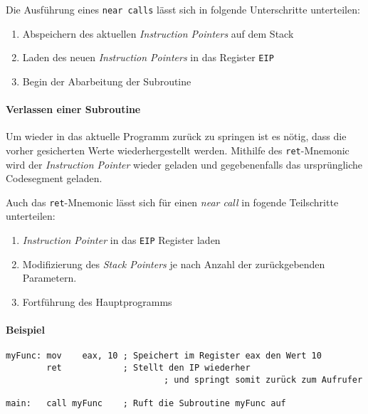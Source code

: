 Die Ausführung eines \texttt{near calls} lässt sich in folgende Unterschritte unterteilen:

\begin{enumerate}
	\item Abspeichern des aktuellen \textit{Instruction Pointers} auf dem Stack
	\item Laden des neuen \textit{Instruction Pointers} in das Register \texttt{EIP}
	\item Begin der Abarbeitung der Subroutine	
\end{enumerate}

\paragraph{Verlassen einer Subroutine}

Um wieder in das aktuelle Programm zurück zu springen ist es nötig, dass die vorher gesicherten Werte wiederhergestellt werden.
Mithilfe des \texttt{ret}-Mnemonic wird der \textit{Instruction Pointer} wieder geladen und gegebenenfalls das ursprüngliche Codesegment geladen.

Auch das \texttt{ret}-Mnemonic lässt sich für einen \textit{near call} in fogende Teilschritte unterteilen:
\begin{enumerate}
	\item \textit{Instruction Pointer} in das \texttt{EIP} Register laden
	\item Modifizierung des \textit{Stack Pointers} je nach Anzahl der zurückgebenden Parametern. 
	\item Fortführung des Hauptprogramms 	
\end{enumerate}

\paragraph{Beispiel\newline}\makebox{}
\begin{lstlisting}
myFunc: mov    eax, 10 ; Speichert im Register eax den Wert 10
        ret            ; Stellt den IP wiederher
				               ; und springt somit zurück zum Aufrufer

main:   call myFunc    ; Ruft die Subroutine myFunc auf
\end{lstlisting}
